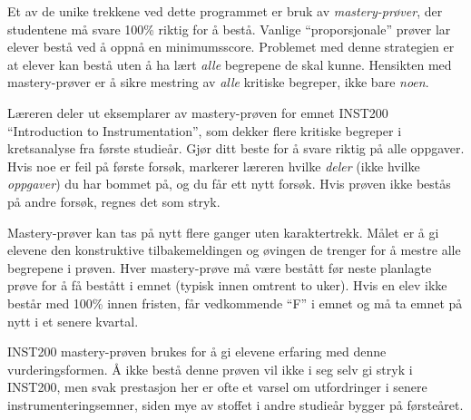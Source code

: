 

Et av de unike trekkene ved dette programmet er bruk av {\it mastery-prøver}, der studentene må svare 100\% riktig for å bestå. Vanlige ``proporsjonale'' prøver lar elever bestå ved å oppnå en minimumsscore. Problemet med denne strategien er at elever kan bestå uten å ha lært {\it alle} begrepene de skal kunne. Hensikten med mastery-prøver er å sikre mestring av {\it alle} kritiske begreper, ikke bare {\it noen}.

\vskip 10pt

Læreren deler ut eksemplarer av mastery-prøven for emnet INST200 ``Introduction to Instrumentation'', som dekker flere kritiske begreper i kretsanalyse fra første studieår. Gjør ditt beste for å svare riktig på alle oppgaver. Hvis noe er feil på første forsøk, markerer læreren hvilke {\it deler} (ikke hvilke {\it oppgaver}) du har bommet på, og du får ett nytt forsøk. Hvis prøven ikke bestås på andre forsøk, regnes det som stryk.

\vskip 10pt

Mastery-prøver kan tas på nytt flere ganger uten karaktertrekk. Målet er å gi elevene den konstruktive tilbakemeldingen og øvingen de trenger for å mestre alle begrepene i prøven. Hver mastery-prøve må være bestått før neste planlagte prøve for å få bestått i emnet (typisk innen omtrent to uker). Hvis en elev ikke består med 100\% innen fristen, får vedkommende ``F'' i emnet og må ta emnet på nytt i et senere kvartal.

\vskip 10pt

INST200 mastery-prøven brukes for å gi elevene erfaring med denne vurderingsformen. Å ikke bestå denne prøven vil ikke i seg selv gi stryk i INST200, men svak prestasjon her er ofte et varsel om utfordringer i senere instrumenteringsemner, siden mye av stoffet i andre studieår bygger på førsteåret.

\vskip 10pt







 









